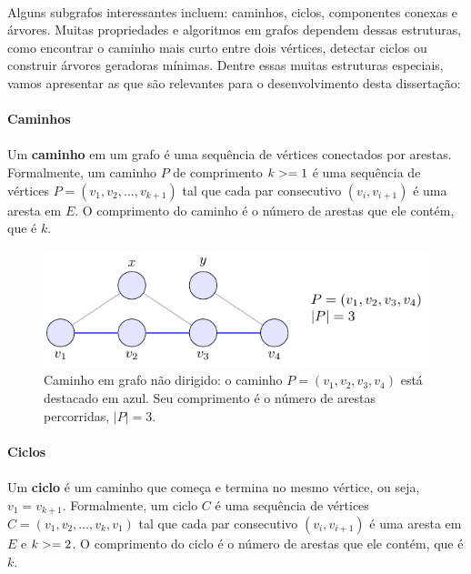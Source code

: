 \documentclass[12pt,a4paper]{article}
\def\geq{\string>=}%
\begin{document}
\paragraph{}
Alguns subgrafos interessantes incluem: caminhos, ciclos, componentes conexas e árvores. Muitas propriedades e algoritmos em grafos dependem dessas estruturas, como encontrar o caminho mais curto entre dois vértices, detectar ciclos ou construir árvores geradoras mínimas. Dentre essas muitas estruturas especiais, vamos apresentar as que são relevantes para o desenvolvimento desta dissertação:

\paragraph{Caminhos}
\paragraph{}Um \textbf{caminho} em um grafo é uma sequência de vértices conectados por arestas. Formalmente, um caminho \(P\) de comprimento \(k\geq 1\) é uma sequência de vértices \(P = (v_1, v_2, \ldots, v_{k+1})\) tal que cada par consecutivo \((v_i, v_{i+1})\) é uma aresta em \(E\). O comprimento do caminho é o número de arestas que ele contém, que é \(k\).


\begin{figure}[H]
    \centering
    \includegraphics[width=0.9\linewidth]{figures/fig_caminho.pdf}

    \caption{Caminho em grafo não dirigido: o caminho $P=(v_1,v_2,v_3,v_4)$ está destacado em azul. Seu comprimento é o número de arestas percorridas, $|P|=3$.}
    \label{fig:caminho}\end{figure}


\paragraph{Ciclos}
\paragraph{}Um \textbf{ciclo} é um caminho que começa e termina no mesmo vértice, ou seja, \(v_1 = v_{k+1}\). Formalmente, um ciclo \(C\) é uma sequência de vértices \(C = (v_1, v_2, \ldots, v_k, v_1)\) tal que cada par consecutivo \((v_i, v_{i+1})\) é uma aresta em \(E\) e \(k \geq 2\). O comprimento do ciclo é o número de arestas que ele contém, que é \(k\).
\end{document}
